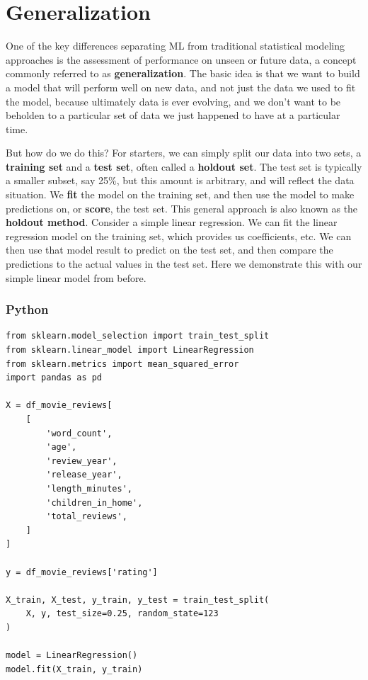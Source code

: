 \documentclass[
  letterpaper,
]{krantz}
\begin{document}
\section{Generalization}\label{sec-ml-generalization}

One of the key differences separating ML from traditional statistical
modeling approaches is the assessment of performance on unseen or future
data, a concept commonly referred to as \textbf{generalization}. The
basic idea is that we want to build a model that will perform well on
new data, and not just the data we used to fit the model, because
ultimately data is ever evolving, and we don't want to be beholden to a
particular set of data we just happened to have at a particular time.

But how do we do this? For starters, we can simply split our data into
two sets, a \textbf{training set} and a \textbf{test set}, often called
a \textbf{holdout set}. The test set is typically a smaller subset, say
25\%, but this amount is arbitrary, and will reflect the data situation.
We \textbf{fit} the model on the training set, and then use the model to
make predictions on, or \textbf{score}, the test set. This general
approach is also known as the \textbf{holdout method}. Consider a simple
linear regression. We can fit the linear regression model on the
training set, which provides us coefficients, etc. We can then use that
model result to predict on the test set, and then compare the
predictions to the actual values in the test set. Here we demonstrate
this with our simple linear model from before.

\subsubsection{Python}

\begin{verbatim}
from sklearn.model_selection import train_test_split
from sklearn.linear_model import LinearRegression
from sklearn.metrics import mean_squared_error
import pandas as pd

X = df_movie_reviews[
    [
        'word_count',
        'age',
        'review_year',
        'release_year',
        'length_minutes',
        'children_in_home',
        'total_reviews',
    ]
]

y = df_movie_reviews['rating']

X_train, X_test, y_train, y_test = train_test_split(
    X, y, test_size=0.25, random_state=123
)

model = LinearRegression()
model.fit(X_train, y_train)
\end{verbatim}
\end{document}
